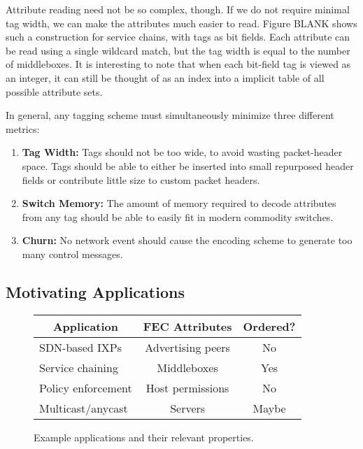 
Attribute reading need not be so complex, though. If we do not require minimal
tag width, we can make the attributes much easier to read. Figure BLANK shows
such a construction for service chains, with tags as bit fields. Each attribute
can be read using a single wildcard match, but the tag width is equal to the
number of middleboxes. It is interesting to note that when each bit-field tag is
viewed as an integer, it can still be thought of as an index into a implicit
table of all possible attribute sets. 

In general, any tagging scheme must simultaneously minimize three different
metrics: \begin{enumerate} \item \textbf{Tag Width:} Tags should not be too
wide, to avoid wasting packet-header space.  Tags should be able to either be
inserted into small repurposed header fields or contribute little size to custom
packet headers.  \item \textbf{Switch Memory:} The amount of memory required to
decode attributes from any tag should be able to easily fit in modern commodity
switches.  \item \textbf{Churn:} No network event should cause the encoding
scheme to generate too many control messages.  \end{enumerate}


\subsection{Motivating Applications} 
\label{ssec:motivating-apps}

\begin{figure} \small \begin{center}
\begin{tabular}{|l|c|c|} \hline \multicolumn{1}{|c|}{\bf Application} &
\multicolumn{1}{c|}{\bf FEC Attributes} & \multicolumn{1}{c|}{\bf Ordered?}\\
\hline SDN-based IXPs & Advertising peers & No \\ \hline Service chaining &
Middleboxes & Yes \\ \hline Policy enforcement & Host permissions & No \\ \hline
Multicast/anycast & Servers & Maybe \\ \hline \end{tabular} \end{center}
\caption{Example applications and their relevant properties. }
\label{tab:applications} \end{figure}

